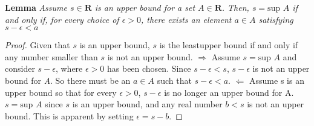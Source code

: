         \textbf{Lemma} \textit{Assume $s \in \textbf{R}$ is an upper bound for a set $A \in \textbf{R}$. Then, $s = \text{sup } A$ if and only if, for every choice of $\epsilon > 0$, there exists an element $a \in A$ satisfying $s - \epsilon < a$}
        \begin{proof}
            Given that $s$ is an upper bound, $s$ is the leastupper bound if and only if any number smaller than $s$ is not an upper bound.
            \newline \indent $\Rightarrow$ Assume $s = \text{sup } A$ and consider $s - \epsilon$, where $\epsilon > 0$ has been chosen. Since $s - \epsilon < s$, $s - \epsilon$ is not an upper bound for \textit{A}. So there must be an $a \in A$ such that $s - \epsilon < a$.
            \newline \indent $\Leftarrow$ Assume s is an upper bound so that for every $\epsilon > 0$, $s - \epsilon$ is no longer an upper bound for A. $s = \text{sup } A$ since $s$ is an upper bound, and any real number $b < s$ is not an upper bound. This is apparent by setting $\epsilon = s - b$. 
        \end{proof}